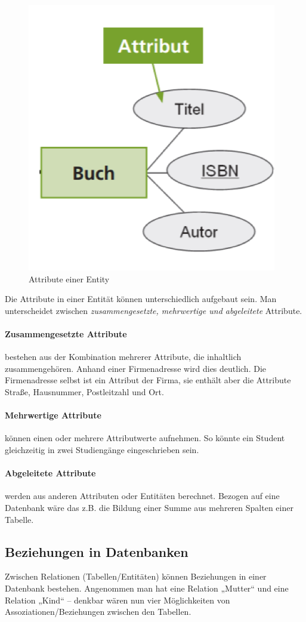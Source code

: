 \begin{figure}[h]
    \centering
    \includegraphics[width=.4\textwidth]{Content/images/modellierung/entity.png}
    \caption{Attribute einer Entity}
    \label{fig:modellierung:entity}
 \end{figure}

 Die Attribute in einer Entität können unterschiedlich aufgebaut sein. Man unterscheidet zwischen \emph{zusammengesetzte, mehrwertige und abgeleitete} Attribute.

 \paragraph{Zusammengesetzte Attribute} bestehen aus der Kombination mehrerer Attribute, die inhaltlich zusammengehören. Anhand einer Firmenadresse wird dies deutlich. Die Firmenadresse selbst ist ein Attribut der Firma, sie enthält aber die Attribute Straße, Hausnummer, Postleitzahl und Ort.

 \paragraph{Mehrwertige Attribute} können einen oder mehrere Attributwerte aufnehmen. So könnte ein Student gleichzeitig in zwei Studiengänge eingeschrieben sein.

 \paragraph{Abgeleitete Attribute} werden aus anderen Attributen oder Entitäten berechnet. Bezogen auf eine Datenbank wäre das z.B. die Bildung einer Summe aus mehreren Spalten einer Tabelle.

 \subsection{Beziehungen in Datenbanken}

 Zwischen Relationen (Tabellen/Entitäten) können Beziehungen in einer Datenbank bestehen. Angenommen man hat eine Relation „Mutter“ und eine Relation „Kind“ – denkbar wären nun vier Möglichkeiten von Assoziationen/Beziehungen zwischen den Tabellen.

